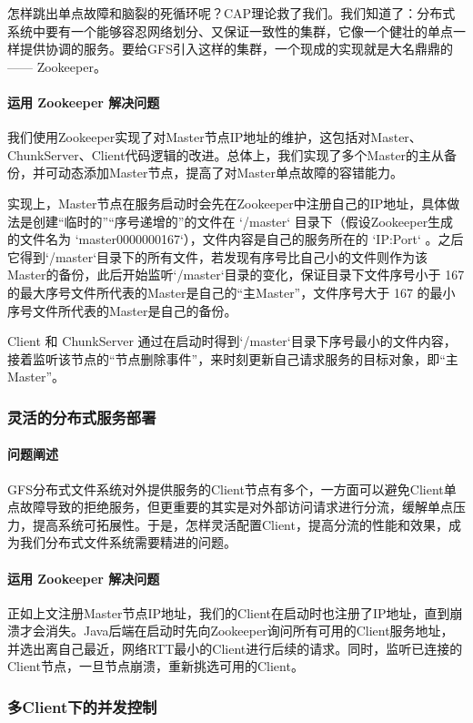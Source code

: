 \documentclass[UTF8]{ctexart}
\begin{document}
怎样跳出单点故障和脑裂的死循环呢？CAP理论救了我们。我们知道了：分布式系统中要有一个能够容忍网络划分、又保证一致性的集群，它像一个健壮的单点一样提供协调的服务。要给GFS引入这样的集群，一个现成的实现就是大名鼎鼎的 —— Zookeeper。
\paragraph{运用 Zookeeper 解决问题}
我们使用Zookeeper实现了对Master节点IP地址的维护，这包括对Master、ChunkServer、Client代码逻辑的改进。总体上，我们实现了多个Master的主从备份，并可动态添加Master节点，提高了对Master单点故障的容错能力。

实现上，Master节点在服务启动时会先在Zookeeper中注册自己的IP地址，具体做法是创建“临时的”“序号递增的”的文件在  `/master` 目录下（假设Zookeeper生成的文件名为 `master0000000167`），文件内容是自己的服务所在的 `IP:Port` 。之后它得到`/master`目录下的所有文件，若发现有序号比自己小的文件则作为该Master的备份，此后开始监听`/master`目录的变化，保证目录下文件序号小于 167 的最大序号文件所代表的Master是自己的“主Master”，文件序号大于 167 的最小序号文件所代表的Master是自己的备份。

Client 和 ChunkServer 通过在启动时得到`/master`目录下序号最小的文件内容，接着监听该节点的“节点删除事件”，来时刻更新自己请求服务的目标对象，即“主Master”。

\subsubsection{灵活的分布式服务部署}
\paragraph{问题阐述}
GFS分布式文件系统对外提供服务的Client节点有多个，一方面可以避免Client单点故障导致的拒绝服务，但更重要的其实是对外部访问请求进行分流，缓解单点压力，提高系统可拓展性。于是，怎样灵活配置Client，提高分流的性能和效果，成为我们分布式文件系统需要精进的问题。
\paragraph{运用 Zookeeper 解决问题}
正如上文注册Master节点IP地址，我们的Client在启动时也注册了IP地址，直到崩溃才会消失。Java后端在启动时先向Zookeeper询问所有可用的Client服务地址，并选出离自己最近，网络RTT最小的Client进行后续的请求。同时，监听已连接的Client节点，一旦节点崩溃，重新挑选可用的Client。
\subsubsection{多Client下的并发控制}
\end{document}
